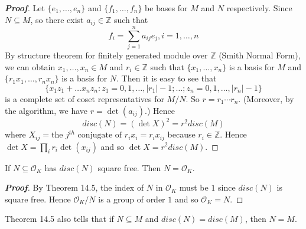 \begin{proof}[\bf Proof] Let $\{e_1,\ldots,e_n\}$ and $\{f_1,\ldots,f_n\}$ be bases for $M$ and $N$ respectively.
Since $N \subseteq M$, so there exist $a_{ij} \in \mathbb{Z}$ such that
$$f_i=\sum_{j=1}^n a_{ij}e_j,i=1,\ldots,n$$
By structure theorem for finitely generated module over $\mathbb{Z}$ (Smith Normal Form), we can obtain
$x_1,\ldots,x_n \in M$ and $r_i \in \mathbb{Z}$ such that $\{x_1,\ldots,x_n\}$ is a basis for $M$ and
$\{r_1x_1,\ldots,r_nx_n\}$ is a basis for $N$. Then it is easy to see that
$$\{x_1z_1+\ldots x_nz_n: z_1=0,1,\ldots,|r_1|-1;\ldots;z_n=0,1,\ldots,|r_n|-1\}$$
is a complete set of coset representatives for $M/N$. So
$r=r_1\cdots r_n$. (Moreover, by the algorithm, we have
$r=\det{(a_{ij})}$.)
Hence $$disc(N)=(\det{X})^2=r^2 disc(M)$$
where $X_{ij}=\text{the } j^{th} \text{ conjugate of }r_ix_i=r_ix_{ij}$ because $r_i \in \mathbb{Z}$.
Hence $\det{X}=\prod_i r_i \det{(x_{ij})}$ and so $\det{X}=r^2 disc(M)$.
\end{proof}
\begin{corollary} If $N \subseteq \mathcal{O}_K$ has $disc(N)$ square free. Then $N=\mathcal{O}_K$.
\end{corollary}
\begin{proof}[\bf Proof] By Theorem 14.5, the index of $N$ in $\mathcal{O}_K$ must be $1$ since $disc(N)$ is square free.
Hence $\mathcal{O}_K/N$ is a group of order $1$ and so $\mathcal{O}_K=N$.
\end{proof}
Theorem 14.5 also tells that if $N \subseteq M$ and $disc(N)=disc(M)$, then $N=M$.
